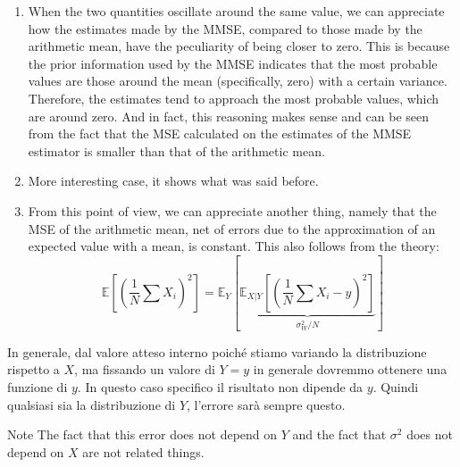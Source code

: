 \begin{enumerate}
    \item When the two quantities oscillate around the same value, we can appreciate how the estimates made by the MMSE, compared to those made by the arithmetic mean, have the peculiarity of being closer to zero. This is because the prior information used by the MMSE indicates that the most probable values are those around the mean (specifically, zero) with a certain variance. Therefore, the estimates tend to approach the most probable values, which are around zero. And in fact, this reasoning makes sense and can be seen from the fact that the MSE calculated on the estimates of the MMSE estimator is smaller than that of the arithmetic mean.
    \item More interesting case, it shows what was said before.
    \item From this point of view, we can appreciate another thing, namely that the MSE of the arithmetic mean, net of errors due to the approximation of an expected value with a mean, is constant. This also follows from the theory:
          $$
              \mathbb E\left[\left(\frac 1N\sum X_i\right)^2\right]=\mathbb E_Y\left[\underbrace{\mathbb E_{X|Y}\left[\left(\frac 1N\sum X_i-y\right)^2\right]}_{\sigma_W^2/N}\right]
          $$
\end{enumerate}

In generale, dal valore atteso interno poiché stiamo variando la distribuzione rispetto a $X$, ma fissando un valore di $Y=y$ in generale dovremmo ottenere una funzione di $y$. In questo caso specifico il risultato non dipende da $y$. Quindi qualsiasi sia la distribuzione di $Y$, l'errore sarà sempre questo.

\begin{note}{Note}
    The fact that this error does not depend on $Y$ and the fact that $\sigma^2$ does not depend on $X$ are not related things.
\end{note}


